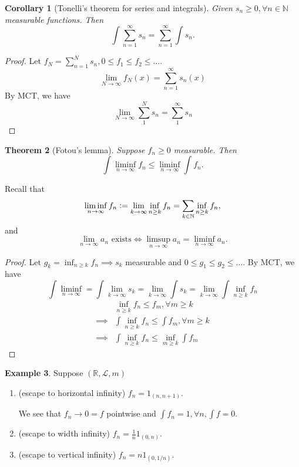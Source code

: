 \documentclass{report}
\newcommand{\R}{\mathbb{R}}
\newcommand{\N}{\mathbb{N}}
\newcommand{\defeq}{\vcentcolon=}
\newtheorem{theorem}{Theorem}[chapter]
\newtheorem{corollary}[theorem]{Corollary}
\theoremstyle{definition}
\newtheorem{example}[theorem]{Example}
\theoremstyle{remark}
\begin{document}
\begin{corollary}[Tonelli's theorem for series and integrals]
	Given $s_n \geq 0, \forall n \in \N$ measurable functions.
	Then
	\[
		\int \sum_{n=1}^\infty	s_n = \sum_{n=1}^\infty \int s_n.
	\]
\end{corollary}
\begin{proof}
	Let $f_N = \sum_{n=1}^N s_n, 0 \leq f_1 \leq f_2 \leq \ldots$.
	\[
		\lim_{N \to \infty}f_N(x) = \sum_{n=1}^\infty s_n(x)\]
	By MCT, we have \[
		\lim_{N \to \infty} \sum_1^N s_n = \sum_1^\infty s_n	
	\]
\end{proof}
\begin{theorem}[Fotou's lemma]
	Suppose $f_n \geq 0$ measurable. Then \[\int \liminf_{n \to \infty} f_n \leq \liminf_{n \to \infty}\int f_n.\]
\end{theorem}
Recall that \[
\liminf_{n \to \infty} f_n \defeq \lim_{k \to \infty} \inf_{n \geq k} f_n = \sum_{k \in \N} \inf_{n \geq k} f_n,
\]
and
\[
\lim_{n \to \infty} a_n \text{ exists} \iff \limsup_{n \to \infty} a_n = \liminf_{n \to \infty} a_n.
\]
\begin{proof}
	Let $g_k = \inf_{n \geq k} f_n \implies s_k$ measurable and $0 \leq g_1 \leq g_2 \leq \ldots$. By MCT, we have \[
		\int \liminf_{n \to \infty} = \int\lim_{k \to \infty} s_k = \lim_{k \to \infty} \int s_k = \lim_{k \to \infty} \int \inf_{n \geq k} f_n
	\]
	\begin{align*}
		& \inf_{n \geq k} f_n \leq f_m, \forall m \geq k \\
		\implies & \int \inf_{n \geq k}f_n \leq \int f_m, \forall m \geq k \\
		\implies & \int \inf_{n \geq k}f_n \leq \inf_{m \geq k}\int f_m
	\end{align*}

\end{proof}

\begin{example}
	Suppose $(\R, \mathcal{L}, m)$
	\begin{enumerate}
		\item (escape to horizontal infinity) $f_n = 1_{(n, n+1)}$.
		
		We see that $f_n \to 0 = f$ pointwise and $\int f_n = 1, \forall n, \int f = 0$.

		\item (escape to width infinity) $f_n = \frac{1}{n}1_{(0, n)}$.
		\item (escape to vertical infinity) $f_n = n1_{(0, 1/n)}$.
	\end{enumerate}	
\end{example}
\end{document}
